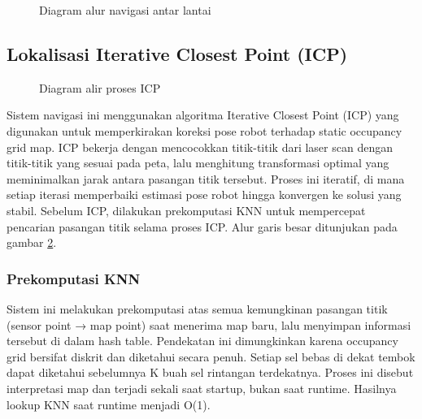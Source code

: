 \begin{figure}[H]
\centering

\caption{Diagram alur navigasi antar lantai}
\label{fig:main_navigation_flow}
\end{figure}



\subsection{Lokalisasi Iterative Closest Point (ICP)}

\begin{figure}[H]
\centering

\caption{Diagram alir proses ICP}
\label{fig:icp_flow}
\end{figure}

Sistem navigasi ini menggunakan algoritma Iterative Closest Point (ICP) yang digunakan untuk memperkirakan koreksi pose robot terhadap static occupancy grid map. ICP bekerja dengan mencocokkan titik-titik dari laser scan dengan titik-titik yang sesuai pada peta, lalu menghitung transformasi optimal yang meminimalkan jarak antara pasangan titik tersebut. Proses ini iteratif, di mana setiap iterasi memperbaiki estimasi pose robot hingga konvergen ke solusi yang stabil. Sebelum ICP, dilakukan prekomputasi KNN untuk mempercepat pencarian pasangan titik selama proses ICP. Alur garis besar ditunjukan pada gambar \ref{fig:icp_flow}.

\subsubsection{Prekomputasi KNN}

Sistem ini melakukan prekomputasi atas semua kemungkinan pasangan titik (sensor point → map point) saat menerima map baru, lalu menyimpan informasi tersebut di dalam hash table. Pendekatan ini dimungkinkan karena occupancy grid bersifat diskrit dan diketahui secara penuh. Setiap sel bebas di dekat tembok dapat diketahui sebelumnya K buah sel rintangan terdekatnya.
Proses ini disebut interpretasi map dan terjadi sekali saat startup, bukan saat runtime. Hasilnya lookup KNN saat runtime menjadi O(1).

